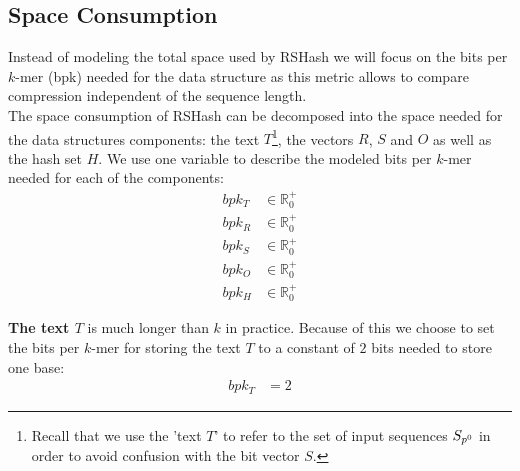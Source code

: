 \documentclass[a4paper,titlepage,onecolumn,oneside,12pt,nenglish,titlepage=firstiscover]{scrbook}
\theoremstyle{plain} %
\theoremstyle{definition} %
\theoremstyle{remark} %
\theoremstyle{plain}
\newcommand{\RR}{\mathbb{R}} %
\begin{document}
\subsection{Space Consumption}
Instead of modeling the total space used by RSHash we will focus on the bits per $k$-mer (bpk) needed for the data structure as this metric allows to compare compression independent of the sequence length.\\
The space consumption of RSHash can be decomposed into the space needed for the data structures components: the text $T$\footnote{Recall that we use the 'text $T$' to refer to the set of input sequences $S_{p^{0}}$ in order to avoid confusion with the bit vector $S$.}, the vectors $R$, $S$ and $O$ as well as the hash set $H$. We use one variable to describe the modeled  bits per $k$-mer needed for each of the components:
\begin{align}
	bpk_T &\in \RR_0^+ \label{variable:bpkT}\\
	bpk_R &\in \RR_0^+ \label{variable:bpkR}\\
	bpk_S &\in \RR_0^+ \label{variable:bpkS}\\
	bpk_O &\in \RR_0^+ \label{variable:bpkO}\\
	bpk_H &\in \RR_0^+ \label{variable:bpkH}
\end{align}

\textbf{The text $T$} is much longer than $k$ in practice. Because of this we choose to set the bits per $k$-mer for storing the text $T$ to a constant of $2$ bits needed to store one base:
\newcommand{\bpkT}{bpk_T &= 2}
\begin{align}
	\bpkT \label{constraint:bpkT}
\end{align} 
 
\end{document}
